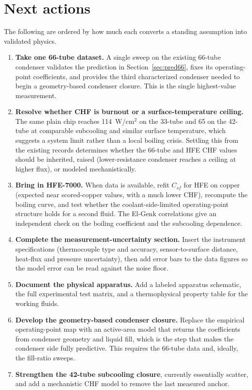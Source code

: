 \documentclass[11pt]{article}
\begin{document}
\section{Next actions}
The following are ordered by how much each converts a standing assumption into validated physics.
\begin{enumerate}
\item \textbf{Take one 66-tube dataset.} A single sweep on the existing 66-tube condenser validates
the prediction in Section~\ref{sec:pred66}, fixes its operating-point coefficients, and provides the
third characterized condenser needed to begin a geometry-based condenser closure. This is the single
highest-value measurement.
\item \textbf{Resolve whether CHF is burnout or a surface-temperature ceiling.} The same plain chip
reaches 114~W/cm$^2$ on the 33-tube and 65 on the 42-tube at comparable subcooling and similar
surface temperature, which suggests a system limit rather than a local boiling crisis. Settling this
from the existing records determines whether the 66-tube and HFE CHF values should be inherited,
raised (lower-resistance condenser reaches a ceiling at higher flux), or modeled mechanistically.
\item \textbf{Bring in HFE-7000.} When data is available, refit $C_{sf}$ for HFE on copper (expected
near scored-copper values, with a much lower CHF), recompute the boiling curve, and test whether the
coolant-side-limited operating-point structure holds for a second fluid. The El-Genk correlations
give an independent check on the boiling coefficient and the subcooling dependence.
\item \textbf{Complete the measurement-uncertainty section.} Insert the instrument specifications
(thermocouple type and accuracy, sensor-to-surface distance, heat-flux and pressure uncertainty),
then add error bars to the data figures so the model error can be read against the noise floor.
\item \textbf{Document the physical apparatus.} Add a labeled apparatus schematic, the full
experimental test matrix, and a thermophysical property table for the working fluids.
\item \textbf{Develop the geometry-based condenser closure.} Replace the empirical operating-point
map with an active-area model that returns the coefficients from condenser geometry and liquid fill,
which is the step that makes the condenser side fully predictive. This requires the 66-tube data and,
ideally, the fill-ratio sweeps.
\item \textbf{Strengthen the 42-tube subcooling closure}, currently essentially scatter, and add a
mechanistic CHF model to remove the last measured anchor.
\end{enumerate}
\end{document}
